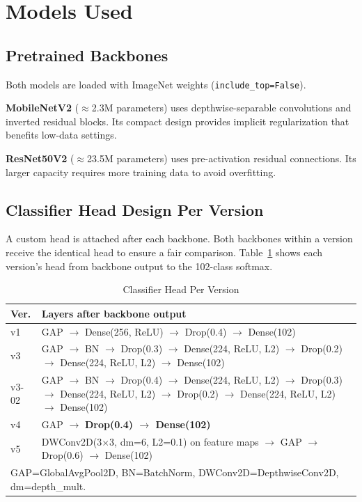 \documentclass[conference]{IEEEtran}
\begin{document}
\section{Models Used}

\subsection{Pretrained Backbones}
Both models are loaded with ImageNet weights (\texttt{include\_top=False}).

\textbf{MobileNetV2} ($\approx$2.3M parameters) uses depthwise-separable
convolutions and inverted residual blocks. Its compact design provides
implicit regularization that benefits low-data settings.

\textbf{ResNet50V2} ($\approx$23.5M parameters) uses pre-activation
residual connections. Its larger capacity requires more training data to
avoid overfitting.

\subsection{Classifier Head Design Per Version}
A custom head is attached after each backbone. Both backbones within a
version receive the identical head to ensure a fair comparison.
Table~\ref{tab:heads} shows each version's head from backbone output to
the 102-class softmax.

\begin{table}[htbp]
  \caption{Classifier Head Per Version}
  \begin{center}
  \begin{tabular}{l p{5.5cm}}
    \toprule
    \textbf{Ver.} & \textbf{Layers after backbone output} \\
    \midrule
    v1 &
      GAP $\to$ Dense(256, ReLU) $\to$ Drop(0.4) $\to$ Dense(102) \\
    \addlinespace
    v3 &
      GAP $\to$ BN $\to$ Drop(0.3) $\to$ Dense(224, ReLU, L2) $\to$
      Drop(0.2) $\to$ Dense(224, ReLU, L2) $\to$ Dense(102) \\
    \addlinespace
    v3-02 &
      GAP $\to$ BN $\to$ Drop(0.4) $\to$ Dense(224, ReLU, L2) $\to$
      Drop(0.3) $\to$ Dense(224, ReLU, L2) $\to$ Drop(0.2) $\to$
      Dense(224, ReLU, L2) $\to$ Dense(102) \\
    \addlinespace
    v4 &
      GAP $\to$ \textbf{Drop(0.4) $\to$ Dense(102)} \\
    \addlinespace
    v5 &
      DWConv2D(3$\times$3, dm=6, L2=0.1) on feature maps
      $\to$ GAP $\to$ Drop(0.6) $\to$ Dense(102) \\
    \bottomrule
    \multicolumn{2}{l}{\footnotesize GAP=GlobalAvgPool2D, BN=BatchNorm,
      DWConv2D=DepthwiseConv2D, dm=depth\_mult.}\\
  \end{tabular}
  \label{tab:heads}
  \end{center}
\end{table}
\end{document}
